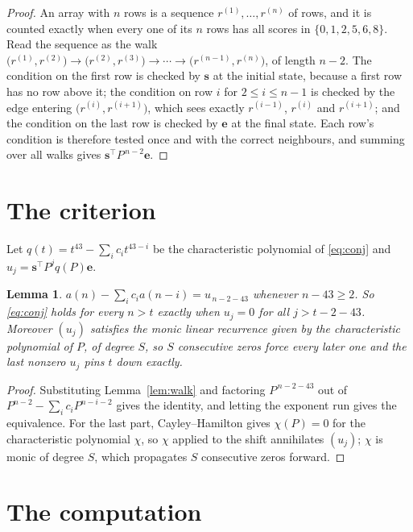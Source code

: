 \documentclass[11pt,a4paper]{article}
\theoremstyle{plain}
\newtheorem{lemma}[theorem]{Lemma}
\theoremstyle{definition}
\begin{document}
\begin{proof}
An array with $n$ rows is a sequence $r^{(1)},\dots,r^{(n)}$ of rows, and it is counted
exactly when every one of its $n$ rows has all scores in $\{0,1,2,5,6,8\}$. Read the sequence as the
walk $\bigl(r^{(1)},r^{(2)}\bigr)\to\bigl(r^{(2)},r^{(3)}\bigr)\to\cdots\to
\bigl(r^{(n-1)},r^{(n)}\bigr)$, of length $n-2$. The condition on the first row is
checked by $\mathbf{s}$ at the initial state, because a first row has no row above it; the
condition on row $i$ for $2\le i\le n-1$ is checked by the edge entering
$\bigl(r^{(i)},r^{(i+1)}\bigr)$, which sees exactly $r^{(i-1)}$, $r^{(i)}$ and
$r^{(i+1)}$; and the condition on the last row is checked by $\mathbf{e}$ at the final
state. Each row's condition is therefore tested once and with the correct neighbours, and
summing over all walks gives $\mathbf{s}^{\!\top}P^{\,n-2}\mathbf{e}$.
\end{proof}

\section{The criterion}

Let $q(t)=t^{43}-\sum_i c_i t^{43-i}$ be the characteristic polynomial of
\eqref{eq:conj} and $u_j=\mathbf{s}^{\!\top}P^{j}q(P)\mathbf{e}$.

\begin{lemma}\label{lem:crit}
$a(n)-\sum_i c_i a(n-i)=u_{\,n-2-43}$ whenever $n-43\ge2$. So \eqref{eq:conj}
holds for every $n>t$ exactly when $u_j=0$ for all $j>t-2-43$. Moreover $(u_j)$
satisfies the monic linear recurrence given by the characteristic polynomial of $P$, of
degree $S$, so $S$ consecutive zeros force every later one and the last nonzero $u_j$ pins
$t$ down exactly.
\end{lemma}

\begin{proof}
Substituting Lemma~\ref{lem:walk} and factoring $P^{\,n-2-43}$ out of
$P^{n-2}-\sum_i c_i P^{n-i-2}$ gives the identity, and letting the exponent run gives the
equivalence. For the last part, Cayley--Hamilton gives $\chi(P)=0$ for the characteristic
polynomial $\chi$, so $\chi$ applied to the shift annihilates $(u_j)$; $\chi$ is monic of
degree $S$, which propagates $S$ consecutive zeros forward.
\end{proof}

\section{The computation}
\end{document}
